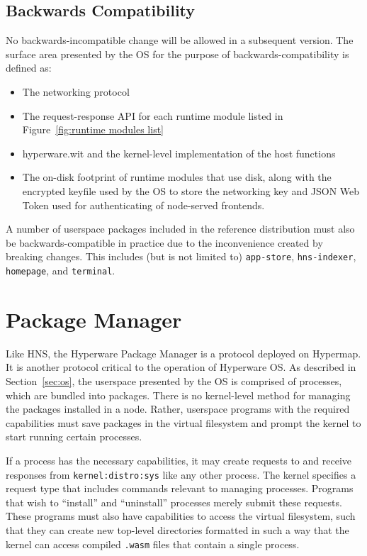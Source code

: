 \documentclass[runningheads]{llncs}
\begin{document}
\subsection{Backwards Compatibility}
\label{sec:osbackwardscompat}

No backwards-incompatible change will be allowed in a subsequent version.
The surface area presented by the OS for the purpose of backwards-compatibility is defined as:
\begin{itemize}
    \item The networking protocol
    \item The request-response API for each runtime module listed in Figure~\ref{fig:runtime modules list}
    \item hyperware.wit and the kernel-level implementation of the host functions
    \item The on-disk footprint of runtime modules that use disk, along with the encrypted keyfile used by the OS to store the networking key and JSON Web Token used for authenticating of node-served frontends.
\end{itemize}

A number of userspace packages included in the reference distribution must also be backwards-compatible in practice due to the inconvenience created by breaking changes.
This includes (but is not limited to) \verb|app-store|, \verb|hns-indexer|, \verb|homepage|, and \verb|terminal|.

\section{Package Manager}
\label{sec:packagemanager}

Like HNS, the Hyperware Package Manager is a protocol deployed on Hypermap.
It is another protocol critical to the operation of Hyperware OS.
As described in Section~\ref{sec:os}, the userspace presented by the OS is comprised of processes, which are bundled into packages.
There is no kernel-level method for managing the packages installed in a node.
Rather, userspace programs with the required capabilities must save packages in the virtual filesystem and prompt the kernel to start running certain processes.

If a process has the necessary capabilities, it may create requests to and receive responses from \verb|kernel:distro:sys| like any other process.
The kernel specifies a request type that includes commands relevant to managing processes.
Programs that wish to ``install'' and ``uninstall'' processes merely submit these requests.
These programs must also have capabilities to access the virtual filesystem, such that they can create new top-level directories formatted in such a way that the kernel can access compiled \verb|.wasm| files that contain a single process.
\end{document}
